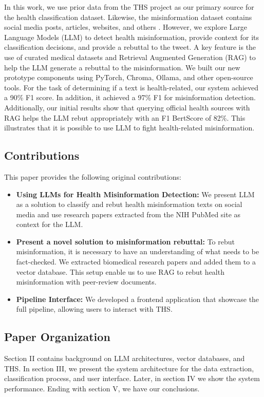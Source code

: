 In this work, we use prior data from the THS project as our primary source for the health classification dataset. Likewise, the misinformation dataset contains social media posts, articles,
websites, and others \cite{stephencrone2022,coviddata,covidunesco}. 
However, we explore  Large Language Models (LLM)  to detect health misinformation, provide context for its classification decisions, and provide a rebuttal to the tweet.  A key feature is the use of 
curated medical datasets and Retrieval Augmented Generation (RAG) to help the LLM generate a rebuttal to the misinformation.
We built our new prototype components using PyTorch, Chroma, Ollama, and other open-source tools. For the task of determining if a text is health-related, our system achieved a 90\% F1 score. In addition, it achieved a 97\% F1 for misinformation detection. Additionally, our initial results show that querying  official health sources with RAG helps the LLM rebut appropriately  with an F1 BertScore of 82\%. This illustrates that it is possible to use LLM to fight health-related misinformation. 

\subsection{Contributions}
This paper provides the following original contributions:
\begin{itemize}
	\item{\textbf{Using LLMs for Health Misinformation Detection:}} 
	 We present LLM as a solution to classify and rebut health misinformation texts on social media and use research papers extracted from the NIH PubMed site as context for the LLM.
	\item{\textbf{Present a novel solution to misinformation rebuttal:}} To rebut misinformation, it is necessary to have an understanding of what needs to be fact-checked. 
	We extracted biomedical research papers and added them to a vector database. This setup enable us to use RAG to rebut health misinformation with peer-review documents.
	\item{\textbf{Pipeline Interface:}} We developed a frontend application that showcase the full pipeline, allowing users to interact with THS.
\end{itemize}


\subsection{Paper Organization}
Section II contains background on LLM  architectures, vector databases, and THS. In section III, we present the system architecture for the data extraction, classification process, and user interface. Later, in section IV we show the system performance. Ending with section V, we have our conclusions.
